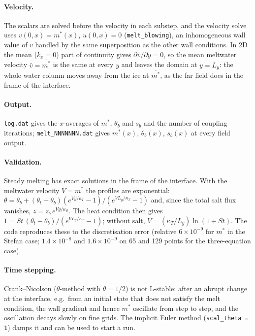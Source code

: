 \documentclass[11pt,a4paper]{article}
\begin{document}
\paragraph{Velocity.} The scalars are solved before the velocity in each substep, and the velocity
solve uses $v(0,x) = m^*(x)$, $u(0,x)=0$ (\texttt{melt\_blowing}), an inhomogeneous wall value of $v$
handled by the same superposition as the other wall conditions. In 2D the mean ($k_x=0$) part of
continuity gives $\partial \bar v/\partial y=0$, so the mean meltwater velocity
$\bar v = \overline{m^*}$ is the same at every $y$ and leaves the domain at $y=L_y$: the whole water
column moves away from the ice at $\overline{m^*}$, as the far field does in the frame of the interface.

\paragraph{Output.} \texttt{log.dat} gives the $x$-averages of $m^*$, $\theta_b$ and $s_b$ and the
number of coupling iterations; \texttt{melt\_NNNNNNN.dat} gives $m^*(x)$, $\theta_b(x)$, $s_b(x)$ at
every field output.

\paragraph{Validation.} Steady melting has exact solutions in the frame of the interface. With the
meltwater velocity $V=m^*$ the profiles are exponential:
$\theta = \theta_b + (\theta_t-\theta_b)(e^{Vy/\kappa_T}-1)/(e^{VL_y/\kappa_T}-1)$ and, since the
total salt flux vanishes, $z = z_b\, e^{Vy/\kappa_S}$. The heat condition then gives
$1 = St\,(\theta_t - \theta_b)/(e^{VL_y/\kappa_T}-1)$; without salt, $V = (\kappa_T/L_y)\ln(1+St)$.
The code reproduces these to the discretisation error (relative $6\times10^{-9}$ for $m^*$ in the
Stefan case; $1.4\times10^{-8}$ and $1.6\times10^{-9}$ on 65 and 129 points for the three-equation case).

\paragraph{Time stepping.} Crank--Nicolson ($\theta$-method with $\theta=1/2$) is not L-stable: after an
abrupt change at the interface, e.g.\ from an initial state that does not satisfy the melt condition, the
wall gradient and hence $m^*$ oscillate from step to step, and the oscillation decays slowly on fine
grids. The implicit Euler method (\texttt{scal\_theta = 1}) damps it and can be used to start a run.
\end{document}
